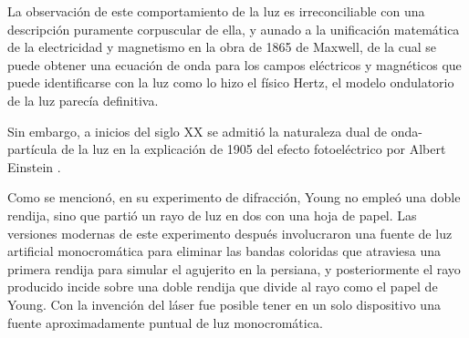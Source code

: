 La observación de este comportamiento de la luz es irreconciliable con una descripción puramente corpuscular de ella, y aunado a la unificación matemática de la electricidad y magnetismo en la obra de 1865 de Maxwell, de la cual se puede obtener una ecuación de onda para los campos eléctricos y magnéticos que puede identificarse con la luz como lo hizo el físico Hertz, el modelo ondulatorio de la luz parecía definitiva.

Sin embargo, a inicios del siglo XX se admitió la naturaleza dual de onda-partícula de la luz en la explicación de 1905 del efecto fotoeléctrico por Albert Einstein \parencite{hecht-1999}.

Como se mencionó, en su experimento de difracción, Young no empleó una doble rendija, sino que partió un rayo de luz en dos con una hoja de papel. Las versiones modernas de este experimento después involucraron una fuente de luz artificial monocromática para eliminar las bandas coloridas que atraviesa una primera rendija para simular el agujerito en la persiana, y posteriormente el rayo producido incide sobre una doble rendija que divide al rayo como el papel de Young.  Con la invención del láser fue posible tener en un solo dispositivo una fuente aproximadamente puntual de luz monocromática.